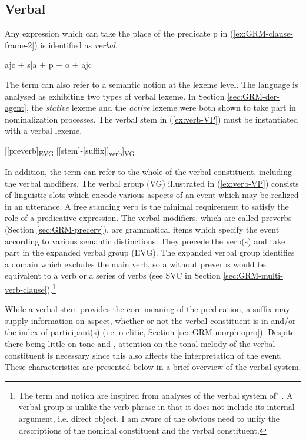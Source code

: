 \begin{exe}
\begin{exe}
\begin{exe}
\begin{exe}
\begin{exe}
\begin{exe}
\begin{exe}
\begin{exe}
\begin{exe}
\begin{exe}
\begin{exe}
\largerpage[-2]
\section{Verbal}
\label{sec:GRM-verbals}


Any expression which can take the place of  the predicate {\sc p} in  (\ref{ex:GRM-clause-frame-2}) is identified as \textit{verbal}.


\begin{exe}
  \ex\label{ex:GRM-clause-frame-2} 
 {\sc ajc}  $\pm$ {\sc s|a}  $+$ {\sc p} $\pm$ {\sc o} $\pm$ {\sc ajc} 
\end{exe}

The term  can also refer to a semantic notion at the lexeme level. The language is analysed as exhibiting two types of verbal lexeme. In Section \ref{sec:GRM-der-agent},  the {\it stative} lexeme and the {\it active} lexeme were both shown to take  part in nominalization processes. The verbal stem in (\ref{ex:verb-VP})  must be instantiated with a verbal lexeme. 

\ea\label{ex:verb-VP}
{\rm [[{preverb}]\textsubscript{EVG} [[{stem}]-[{suffix}]]\textsubscript{verb}]\textsubscript{VG}}
\z


In addition, the term  can refer to the whole of the verbal constituent, including the verbal modifiers. The verbal group   (VG) illustrated in (\ref{ex:verb-VP}) consists of linguistic slots which encode   various aspects of an event  which may be realized in an utterance. A free standing verb is the minimal requirement to satisfy the role of a predicative expression. The verbal modifiers, which are called preverbs (Section \ref{sec:GRM-precerv}),  are grammatical items which specify the event according to various  semantic distinctions. They precede the  verb(s) and take part in the expanded verbal group  (EVG). The expanded verbal group identifies  a domain which excludes the main verb, so a   without preverbs would  be equivalent to a verb or a series of verbs (see SVC in Section \ref{sec:GRM-multi-verb-clause}).\footnote{The term and notion are inspired from analyses of the verbal system of ̃ \citep{Daku70}. A verbal group is unlike the verb phrase in that it does not include its internal argument, i.e. direct object. I am aware of the obvious need to unify the descriptions of the nominal constituent and the verbal constituent.} 

While a verbal stem provides the core meaning of the predication,  a suffix may supply information on  aspect, whether or not the verbal constituent is in  and/or the index of participant(s) (i.e. {\sc o}-clitic, Section \ref{sec:GRM-morph-opro}).  Despite there being little  on tone and , attention on the tonal melody of the verbal constituent is necessary since this also affects the interpretation of the event. These characteristics are presented below in a brief overview of the verbal system. 


\end{exe}
\end{exe}
\end{exe}
\end{exe}
\end{exe}
\end{exe}
\end{exe}
\end{exe}
\end{exe}
\end{exe}
\end{exe}
